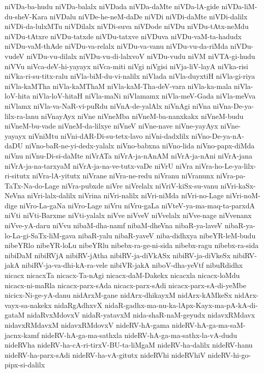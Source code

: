 {niVDa-ba-hudu
niVDa-balalx
niVDada
niVDa-daMte
niVDa-lA-gide
niVDa-liM-du-sheV-Kara
niVDalu
niVDe-he-neM-daDe
niVDi
niVDi-daMte
niVDi-dalilx
niVDi-da-lulxMTu
niVDilalx
niVDi-suva
niVDode
niVDu
niVDu-tAtx-neMdu
niVDu-tAtxre
niVDu-tatxde
niVDu-tatxve
niVDuva
niVDu-vaM-ta-hadudx
niVDu-vaM-thAde
niVDu-va-relalx
niVDu-va-vanu
niVDu-vu-da-riMda
niVDu-vudeV
niVDu-vu-dilalx
niVDu-vu-di-lalxvoV
niVDu-vudu
niVM
niVTA-gi-hudu
niVVu
niVca-deV-hi-yayayx
niVca-miti
niVgi
niVgisi
niVja-liV-layA
niVka-risi
niVka-ri-su-titx-ralu
niVla-biM-du-vi-nalilx
niVlada
niVla-duyxtiH
niVla-gi-riya
niVla-kaMTha
niVla-kaMThaM
niVla-kaM-Tha-deV-vara
niVla-ka-mala
niVla-loV-hita
niVla-loV-hitaH
niVla-maNi
niVlamamx
niVla-meV-Gada
niVla-meVva
niVlamx
niVla-va-NaR-vi-puRdu
niVnA-de-yalAlx
niVnAgi
niVna
niVna-De-ya-lilx-ra-lanu
niVnayAyx
niVne
niVneMba
niVneM-ba-nanxkakx
niVneM-budu
niVneM-bu-vade
niVneM-da-lilxye
niVneV
niVne-nave
niVne-yayAyx
niVne-yayayx
niVniMtu
niVni-dAR-Di-su-tetx-lavo
niVni-dadxlilx
niVno-De-ya-nA-daDU
niVno-baR-ne-yi-dedx-yalalx
niVno-babxna
niVno-lida
niVno-papx-diMda
niVnu
niVnu-Di-si-daMte
niVrATa
niVrA-ja-nAnAM
niVrA-ja-nAni
niVrA-jana
niVrA-ja-na-tarxyaM
niVrA-ja-na-ve-tutx-vaDe
niVrU
niVra
niVra-ho-Le-ya-lilx-ri-situtx
niVra-lA-yitutx
niVrane
niVra-ne-redu
niVranu
niVranunx
niVra-pa-TaTx-Na-do-Lage
niVra-pubxde
niVre
niVrelalx
niVriV-kiSx-su-vanu
niVri-kaSx-NeVna
niVri-lalx-dalilx
niVrina
niVri-nalilx
niVri-niMda
niVri-no-Lage
niVri-noM-dige
niVro-La-gaNa
niVro-Lage
niVru
niVru-gaLa
niVteV-ya-ma-maq-ta-parxdA
niVti
niVti-Barxme
niVti-yalalx
niVve
niVveV
niVvelalx
niVve-nage
niVvenanx
niVve-yA-daru
niVvu
nibaM-dha-namf
nibaM-dheVna
nibaR-ya-laveV
nibaR-ya-lo-La-gi-SaTx-liM-gava
nibaR-yalu
nibaR-yaveV
niba-didhxya
nibeYR-leM-budu
nibeYRlo
nibeYR-loLu
nibeYRlu
nibebx-ra-ge-ni-sida
nibebx-ragu
nibebx-ra-sida
nibiDaM
nibiRVjA
nibiRV-jAtha
nibiRV-ja-diVkASx
nibiRV-ja-diVkeSx
nibiRV-jakA
nibiRV-ja-va-dhi-kA-ra-vele
nibiVR-jakA
niboV-dha-yeVtf
nibuRdidhx
nicacx
nicacxTa
nicacx-Ta-nAgi
nicacx-daM-Dakekx
nicacxla
nicacx-loMdu
nicacx-ni-maRla
nicacx-parx-sAda
nicacx-parx-sAdi
nicacx-parx-sA-di-yeMbe
nicicx-Ni-ge-yA-danu
nidArxM-gane
nidArx-dhikayxM
nidArx-kAMkeSx
nidArx-vayx-sa-nakekx
nidaRgAdhxvX
nidaR-gadhx-ma-nu-ka-lApx-Kayx-ma-pA-kA-di-gataM
nidaRvxMdovxV
nidaR-yatavxM
nida-shaR-naM-geyudx
nidavxRMdavx
nidavxRMdavxM
nidavxRMdovxV
nideRV-hA-gama
nideRV-hA-ga-ma-saM-jacnx-kamf
nideRV-hA-ga-ma-sathxla
nideRV-hA-ga-ma-sathx-la-vA-dudu
nideRVha
nideRV-ha-cA-ri-tirxV-BU-ta-liMgaM
nideRV-ha-dalilx
nideRV-hanu
nideRV-ha-parx-sAdi
nideRV-ha-vA-gitutx
nideRVhi
nideRVhiV
nideRV-hi-go-pipx-si-dalilx
}
